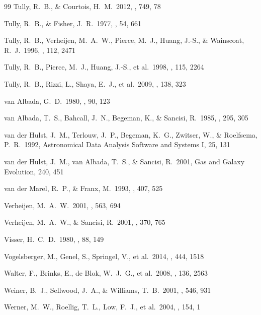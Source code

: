 \documentclass[usenatbib,useAMS]{mnras}
\begin{document}
\begin{thebibliography}{99}
 Tully, R.~B., \& Courtois, H.~M.\ 2012, \apj, 749, 78 

 Tully, R.~B., \& Fisher, J.~R.\ 1977, \aap, 54, 661 

 Tully, R.~B., Verheijen, 
M.~A.~W., Pierce, M.~J., Huang, J.-S., 
\& Wainscoat, R.~J.\ 1996, \aj, 112, 2471 

 Tully, R.~B., Pierce, 
M.~J., Huang, J.-S., et al.\ 1998, \aj, 115, 2264

 Tully, R.~B., Rizzi, L., Shaya, E.~J., et al.\ 2009, \aj, 138, 323 

 van Albada, G.~D.\ 1980, \aap, 90, 123 

 van Albada, T.~S., 
Bahcall, J.~N., Begeman, K., \& Sancisi, R.\ 1985, \apj, 295, 305 

 van der Hulst, 
J.~M., Terlouw, J.~P., Begeman, K.~G., Zwitser, W., 
\& Roelfsema, P.~R.\ 1992, Astronomical Data Analysis Software and Systems I, 25, 131

 van der Hulst, 
J.~M., van Albada, T.~S., 
\& Sancisi, R.\ 2001, Gas and Galaxy Evolution, 240, 451

 van der Marel, R.~P., \& Franx, M.\ 1993, \apj, 407, 525

 Verheijen, M.~A.~W.\ 2001, 
\apj, 563, 694 

 Verheijen, M.~A.~W., \& Sancisi, R.\ 2001, \aap, 370, 765

 Visser, H.~C.~D.\ 1980, \aap, 88, 149

 Vogelsberger, M., 
Genel, S., Springel, V., et al.\ 2014, \mnras, 444, 1518

 Walter, F., Brinks, E., 
de Blok, W.~J.~G., et al.\ 2008, \aj, 136, 2563 

 Weiner, B.~J., Sellwood, 
J.~A., \& Williams, T.~B.\ 2001, \apj, 546, 931 

 Werner, M.~W., Roellig, 
T.~L., Low, F.~J., et al.\ 2004, \apjs, 154, 1


\end{thebibliography}
\end{document}
